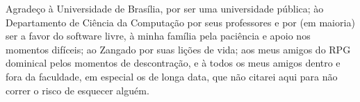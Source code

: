 
Agradeço à Universidade de Brasília, por ser uma universidade pública; ào Departamento de Ciência da Computação por seus professores e por (em maioria) ser a favor do software livre, à minha família pela paciência e apoio nos momentos difíceis; ao Zangado por suas lições de vida; aos meus amigos do RPG dominical pelos momentos de descontração, e à todos os meus amigos dentro e fora da faculdade, em especial os de longa data, que não citarei aqui para não correr o risco de esquecer alguém.